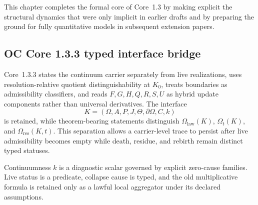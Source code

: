 This chapter completes the formal core of Core~1.3 by making explicit the
structural dynamics that were only implicit in earlier drafts and by preparing
the ground for fully quantitative models in subsequent extension papers.


\subsection{OC Core 1.3.3 typed interface bridge}
\label{sec:oc133-operators-scientific-closure-bridge}

Core~1.3.3 states the continuum carrier separately from live realizations,
uses resolution-relative quotient distinguishability at \(K_0\), treats
boundaries as admissibility classifiers, and reads \(F,G,H,Q,R,S,U\) as
hybrid update components rather than universal derivatives.  The interface
\[
K=(\Omega,A,P,J,\Theta,\partial\Omega,C,k)
\]
is retained, while theorem-bearing statements distinguish
\(\Omega_{\mathrm{law}}(K)\), \(\Omega_t(K)\), and
\(\Omega_{\mathrm{res}}(K,t)\).  This separation allows a carrier-level trace
to persist after live admissibility becomes empty while death, residue, and
rebirth remain distinct typed statuses.

Continuumness \(k\) is a diagnostic scalar governed by explicit zero-cause
families.  Live status is a predicate, collapse cause is typed, and the old
multiplicative formula is retained only as a lawful local aggregator under its
declared assumptions.
